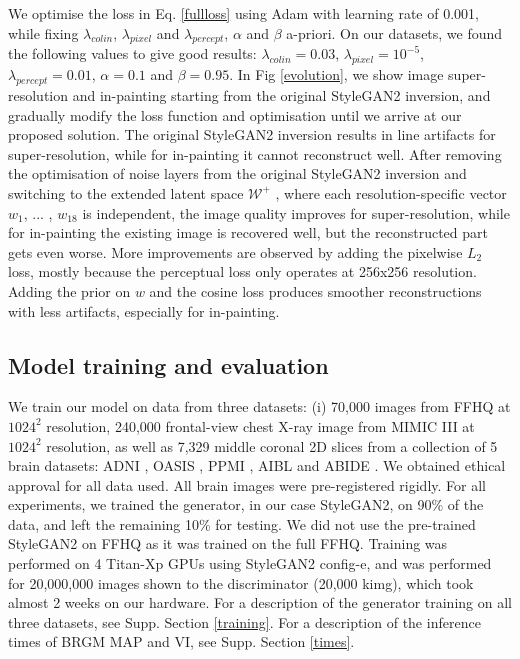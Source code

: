 \documentclass{article}
\newcommand{\wplus}{$\mathcal{W}^{+}$ }
\begin{document}
We optimise the loss in Eq. \ref{fullloss} using Adam \cite{kingma2014adam} with learning rate of 0.001, while fixing $\lambda_{colin}$, $\lambda_{pixel}$ and $\lambda_{percept}$, $\alpha$ and $\beta$ a-priori. On our datasets, we found the following values to give good results: $\lambda_{colin} = 0.03$, $\lambda_{pixel} = 10^{-5}$, $\lambda_{percept} = 0.01$, $\alpha = 0.1$ and $\beta = 0.95$. In Fig \ref{evolution}, we show image super-resolution and in-painting starting from the original StyleGAN2 inversion, and gradually modify the loss function and optimisation until we arrive at our proposed solution. The original StyleGAN2 inversion results in line artifacts for super-resolution, while for in-painting it cannot reconstruct well. After removing the optimisation of noise layers from the original StyleGAN2 inversion\cite{karras2020analyzing} and switching to the extended latent space \wplus, where each resolution-specific vector $w_1$, ... , $w_{18}$ is independent, the image quality improves for super-resolution, while for in-painting the existing image is recovered well, but the reconstructed part gets even worse. More improvements are observed by adding the pixelwise $L_2$ loss, mostly because the perceptual loss only operates at 256x256 resolution. Adding the prior on $w$ and the cosine loss produces smoother reconstructions with less artifacts, especially for in-painting. 


 
\subsection{Model training and evaluation}
\label{trainingmain}

We train our model on data from three datasets: (i) 70,000 images from FFHQ \cite{karras2019style} at $1024^2$ resolution, 240,000 frontal-view chest X-ray image from MIMIC III \cite{johnson2016mimic} at $1024^2$ resolution, as well as 7,329 middle coronal 2D slices from a collection of 5 brain datasets: ADNI \cite{jack2008alzheimer}, OASIS \cite{marcus2010open}, PPMI \cite{marek2018parkinson}, AIBL \cite{ellis2009australian} and ABIDE \cite{heinsfeld2018identification}. We obtained ethical approval for all data used. All brain images were pre-registered rigidly. For all experiments, we trained the generator, in our case StyleGAN2, on 90\% of the data, and left the remaining 10\% for testing. We did not use the pre-trained StyleGAN2 on FFHQ as it was trained on the full FFHQ. Training was performed on 4 Titan-Xp GPUs using StyleGAN2 config-e, and was performed for 20,000,000 images shown to the discriminator (20,000 kimg), which took almost 2 weeks on our hardware. For a description of the generator training on all three datasets, see Supp. Section \ref{training}. For a description of the inference times of BRGM MAP and VI, see Supp. Section \ref{times}.
\end{document}
